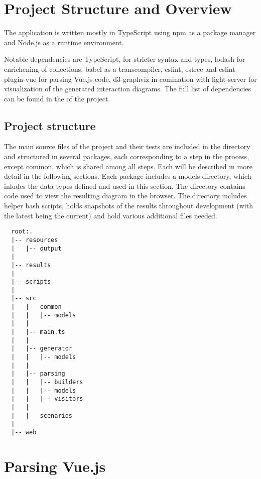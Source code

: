 \section{Project Structure and Overview}
The application is written mostly in TypeScript using npm as a package manager and Node.js as a runtime environment. 




Notable dependencies are TypeScript, for stricter syntax and types, lodash for enrichening of collections, babel as a transcompiler, eslint, estree and eslint-plugin-vue for parsing Vue.js code, d3-graphviz in comination with light-server for visualization of the generated interaction diagrams. The full list of dependencies can be found in the  of the project.


\subsection{Project structure}
The main source files of the project and their tests are included in the  directory and structured in several packages, each corresponding to a step in the process, except common, which is shared among all steps. Each will be described in more detail in the following sections.
Each package includes a models directory, which inludes the data types defined and used in this section.
The  directory contains code used to view the resulting diagram in the browser.
The  directory includes helper bash scripts,  holds snapshots of the results throughout development (with the latest being the current) and  hold various additional files needed.
\begin{lstlisting}
  root:.
  |-- resources
  |   |-- output
  |
  |-- results
  |
  |-- scripts
  |
  |-- src
  |   |-- common
  |   |   |-- models
  |   |
  |   |-- main.ts
  |   |
  |   |-- generator
  |   |   |-- models
  |   |
  |   |-- parsing
  |   |   |-- builders
  |   |   |-- models
  |   |   |-- visitors
  |   |
  |   |-- scenarios
  |
  |-- web
\end{lstlisting}

\section{Parsing Vue.js}

